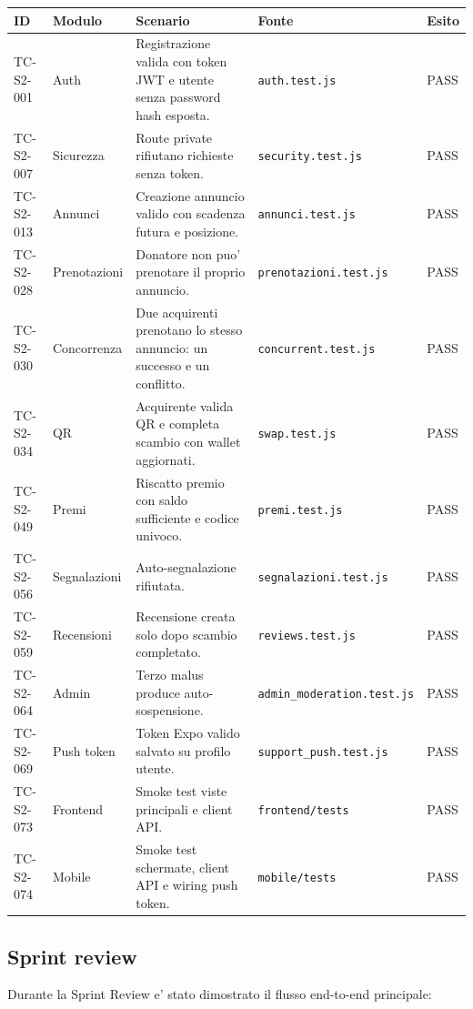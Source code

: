 \documentclass[11pt,a4paper]{article}
\newcommand{\code}[1]{\texttt{#1}}
\begin{document}
\begin{longtable}{L{1.7cm} L{2.6cm} L{6.2cm} L{3.2cm} L{2cm}}
\toprule
\textbf{ID} & \textbf{Modulo} & \textbf{Scenario} & \textbf{Fonte} & \textbf{Esito} \\
\midrule
TC-S2-001 & Auth & Registrazione valida con token JWT e utente senza password hash esposta. & \code{auth.test.js} & PASS \\
TC-S2-007 & Sicurezza & Route private rifiutano richieste senza token. & \code{security.test.js} & PASS \\
TC-S2-013 & Annunci & Creazione annuncio valido con scadenza futura e posizione. & \code{annunci.test.js} & PASS \\
TC-S2-028 & Prenotazioni & Donatore non puo' prenotare il proprio annuncio. & \code{prenotazioni.test.js} & PASS \\
TC-S2-030 & Concorrenza & Due acquirenti prenotano lo stesso annuncio: un successo e un conflitto. & \code{concurrent.test.js} & PASS \\
TC-S2-034 & QR & Acquirente valida QR e completa scambio con wallet aggiornati. & \code{swap.test.js} & PASS \\
TC-S2-049 & Premi & Riscatto premio con saldo sufficiente e codice univoco. & \code{premi.test.js} & PASS \\
TC-S2-056 & Segnalazioni & Auto-segnalazione rifiutata. & \code{segnalazioni.test.js} & PASS \\
TC-S2-059 & Recensioni & Recensione creata solo dopo scambio completato. & \code{reviews.test.js} & PASS \\
TC-S2-064 & Admin & Terzo malus produce auto-sospensione. & \code{admin\_moderation.test.js} & PASS \\
TC-S2-069 & Push token & Token Expo valido salvato su profilo utente. & \code{support\_push.test.js} & PASS \\
TC-S2-073 & Frontend & Smoke test viste principali e client API. & \code{frontend/tests} & PASS \\
TC-S2-074 & Mobile & Smoke test schermate, client API e wiring push token. & \code{mobile/tests} & PASS \\
\bottomrule
\end{longtable}

\subsection{Sprint review}

Durante la Sprint Review e' stato dimostrato il flusso end-to-end principale:
\end{document}
